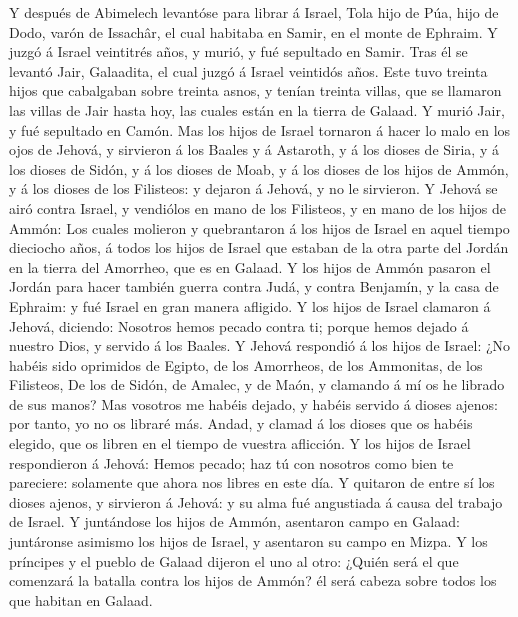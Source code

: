  Y después de Abimelech levantóse para librar á Israel, Tola
hijo de Púa, hijo de Dodo, varón de Issachâr, el cual habitaba en Samir,
en el monte de Ephraim.  Y juzgó á Israel veintitrés años, y
murió, y fué sepultado en Samir.  Tras él se levantó Jair,
Galaadita, el cual juzgó á Israel veintidós años.  Este tuvo
treinta hijos que cabalgaban sobre treinta asnos, y tenían treinta
villas, que se llamaron las villas de Jair hasta hoy, las cuales están
en la tierra de Galaad.  Y murió Jair, y fué sepultado en
Camón.  Mas los hijos de Israel tornaron á hacer lo malo en
los ojos de Jehová, y sirvieron á los Baales y á Astaroth, y á los
dioses de Siria, y á los dioses de Sidón, y á los dioses de Moab, y á
los dioses de los hijos de Ammón, y á los dioses de los Filisteos: y
dejaron á Jehová, y no le sirvieron.  Y Jehová se airó
contra Israel, y vendiólos en mano de los Filisteos, y en mano de los
hijos de Ammón:  Los cuales molieron y quebrantaron á los
hijos de Israel en aquel tiempo dieciocho años, á todos los hijos de
Israel que estaban de la otra parte del Jordán en la tierra del
Amorrheo, que es en Galaad.  Y los hijos de Ammón pasaron el
Jordán para hacer también guerra contra Judá, y contra Benjamín, y la
casa de Ephraim: y fué Israel en gran manera afligido.  Y
los hijos de Israel clamaron á Jehová, diciendo: Nosotros hemos pecado
contra ti; porque hemos dejado á nuestro Dios, y servido á los Baales.
 Y Jehová respondió á los hijos de Israel: ¿No habéis sido
oprimidos de Egipto, de los Amorrheos, de los Ammonitas, de los
Filisteos,  De los de Sidón, de Amalec, y de Maón, y
clamando á mí os he librado de sus manos?  Mas vosotros me
habéis dejado, y habéis servido á dioses ajenos: por tanto, yo no os
libraré más.  Andad, y clamad á los dioses que os habéis
elegido, que os libren en el tiempo de vuestra aflicción. 
Y los hijos de Israel respondieron á Jehová: Hemos pecado; haz tú con
nosotros como bien te pareciere: solamente que ahora nos libres en este
día.  Y quitaron de entre sí los dioses ajenos, y sirvieron
á Jehová: y su alma fué angustiada á causa del trabajo de Israel.
 Y juntándose los hijos de Ammón, asentaron campo en
Galaad: juntáronse asimismo los hijos de Israel, y asentaron su campo en
Mizpa.  Y los príncipes y el pueblo de Galaad dijeron el
uno al otro: ¿Quién será el que comenzará la batalla contra los hijos de
Ammón? él será cabeza sobre todos los que habitan en Galaad.

